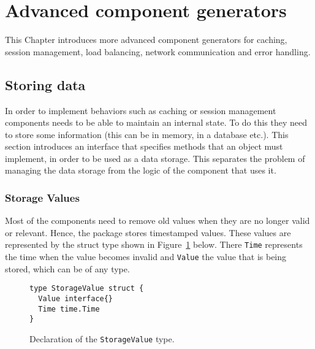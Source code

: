 \section{Advanced component generators}
\label{sec:impl2}
This Chapter introduces more advanced component generators for caching,
session management, load balancing, network communication and error handling.

\subsection{Storing data}
In order to implement behaviors such as caching or session management
components needs to be able to maintain an internal state.
To do this they need to store some information (this can be in memory, 
in a database etc.).
This section introduces an interface that specifies methods that an 
object must implement, in order to be used as a data storage. This 
separates the problem of managing the data storage from the logic of
the component that uses it.

\subsubsection{Storage Values}
Most of the components need to remove old values when they are no longer
valid or relevant. Hence, the package stores timestamped values. 
These values are represented by the struct type shown in 
Figure~\ref{fig:StorageValue} below. There \texttt{Time} represents the time 
when the value becomes invalid and \texttt{Value} the value that is being
stored, which can be of any type.
\begin{figure}[h]
\centering
\begin{lstlisting}
type StorageValue struct {
  Value interface{}
  Time time.Time
}
\end{lstlisting}
\caption[scale=1.0]{Declaration of the \texttt{StorageValue} type.}
\label{fig:StorageValue}
\end{figure}

